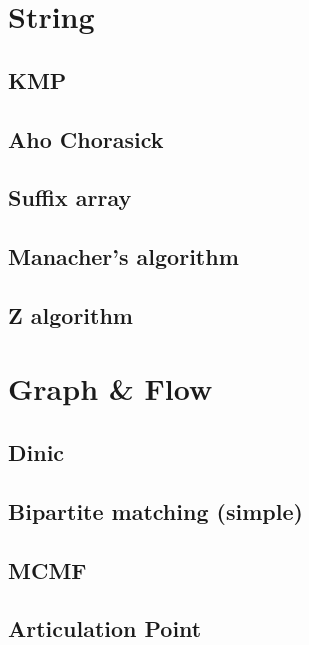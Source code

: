\documentclass[10pt,landscape,a4paper,twocolumn]{article}
\begin{document}
\section{String}
\subsection{KMP}


\subsection{Aho Chorasick}


\subsection{Suffix array}


\subsection{Manacher's algorithm}


\subsection{Z algorithm}


\newpage

\section{Graph \& Flow}
\subsection{Dinic}


\subsection{Bipartite matching (simple)}


\subsection{MCMF}


\subsection{Articulation Point}

\end{document}

